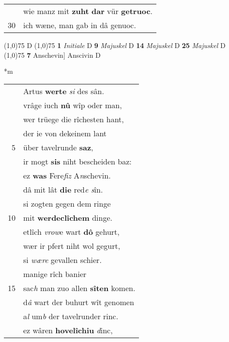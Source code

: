 \documentclass[8pt,a4paper,notitlepage]{article}
\begin{document}
\begin{table}[ht]
\begin{minipage}[t]{0.5\linewidth}
\begin{tabular}{rl}
 & wie manz mit \textbf{zuht} \textbf{dar} vür \textbf{getruoc}.\\ 
30 & ich wæne, man gab in dâ genuoc.\\ 
\end{tabular}
\scriptsize
\line(1,0){75} \newline
D \newline
\line(1,0){75} \newline
\textbf{1} \textit{Initiale} D  \textbf{9} \textit{Majuskel} D  \textbf{14} \textit{Majuskel} D  \textbf{25} \textit{Majuskel} D  \newline
\line(1,0){75} \newline
\textbf{7} Anschevin] Anscivin D \newline
\end{minipage}
\hspace{0.5cm}
\begin{minipage}[t]{0.5\linewidth}
\small
\begin{center}*m
\end{center}
\begin{tabular}{rl}
 & Artus \textbf{werte} \textit{si} des sân.\\ 
 & vrâge iuch \textbf{nû} wîp oder man,\\ 
 & wer trüege die rîchesten hant,\\ 
 & der ie von dekeinem lant\\ 
5 & über tavelrunde \textbf{saz},\\ 
 & ir mogt \textbf{sis} niht bescheiden baz:\\ 
 & ez \textbf{was} Fere\textit{fiz} A\textit{n}schevin.\\ 
 & dâ mit lât \textbf{die} red\textit{e s}în.\\ 
 & si zogten gegen dem ringe\\ 
10 & mit \textbf{werdeclîchem} dinge.\\ 
 & etlîch \textit{vrow}e wart \textbf{dô} gehurt,\\ 
 & wær ir pfert niht wol gegurt,\\ 
 & si \textit{wære} gevallen schier.\\ 
 & manige rîch banier\\ 
15 & sac\textit{h} man zuo allen \textbf{sîten} komen.\\ 
 & d\textit{â} wart der buhurt wît genomen\\ 
 & a\textit{l} um\textit{b} der tavelrunder rinc.\\ 
 & ez wâren \textbf{hovelîchiu} \textit{d}inc,\\ 

\end{tabular}
\end{minipage}
\end{table}
\end{document}
